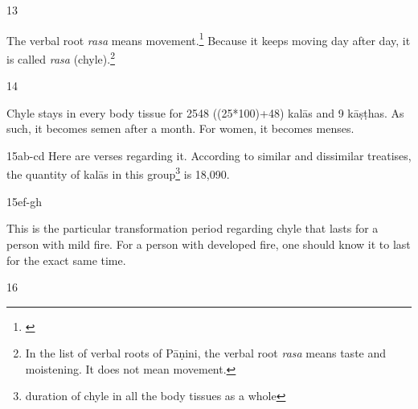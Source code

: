 \begin{translation}
\item[13]

The verbal root \emph{rasa} means movement.\footnote{\cite[109]{kunj-1907}} Because it keeps moving day after day, it is called \emph{rasa} (chyle).\footnote{In the list of verbal roots of Pāṇini, the verbal root \emph{rasa} means taste and moistening. It does not mean movement.}    

\item[14]

Chyle stays in every body tissue for 2548 ((25*100)+48) kalās and 9 kāṣṭhas. As such, it becomes semen after a month. For women, it becomes menses.  

\item[15ab-cd] Here are verses regarding it.
According to similar and dissimilar treatises, the quantity of kalās in this group\footnote{duration of chyle in all the body tissues as a whole} is 18,090.

\item[15ef-gh]

This is the particular transformation period regarding chyle that lasts for a person with mild fire. For a person with developed fire, one should know it to last for the exact same time.




\item[16]




\end{translation}

